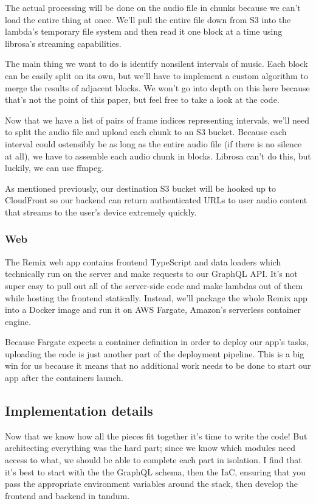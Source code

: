 \documentclass{article}
\begin{document}
The actual processing will be done on the audio file in chunks because we can't load the entire thing at once.
We'll pull the entire file down from S3 into the lambda's temporary file system and then read it one block at a time using librosa's streaming capabilities.

The main thing we want to do is identify nonsilent intervals of music.
Each block can be easily split on its own, but we'll have to implement a custom algorithm to merge the results of adjacent blocks.
We won't go into depth on this here because that's not the point of this paper, but feel free to take a look at the code.

Now that we have a list of pairs of frame indices representing intervals, we'll need to split the audio file and upload each chunk to an S3 bucket.
Because each interval could ostensibly be as long as the entire audio file (if there is no silence at all), we have to assemble each audio chunk in blocks.
Librosa can't do this, but luckily, we can use ffmpeg.

As mentioned previously, our destination S3 bucket will be hooked up to CloudFront so our backend can return authenticated URLs to user audio content that streams to the user's device extremely quickly.

\subsubsection{Web}

The Remix web app contains frontend TypeScript and data loaders which technically run on the server and make requests to our GraphQL API.
It's not super easy to pull out all of the server-side code and make lambdas out of them while hosting the frontend statically.
Instead, we'll package the whole Remix app into a Docker image and run it on AWS Fargate, Amazon's serverless container engine.

Because Fargate expects a container definition in order to deploy our app's tasks, uploading the code is just another part of the deployment pipeline.
This is a big win for us because it means that no additional work needs to be done to start our app after the containers launch.

\subsection{Implementation details}

Now that we know how all the pieces fit together it's time to write the code!
But architecting everything was the hard part; since we know which modules need access to what, we should be able to complete each part in isolation.
I find that it's best to start with the the GraphQL schema, then the IaC, ensuring that you pass the appropriate environment variables around the stack, then develop the frontend and backend in tandum.
\end{document}
